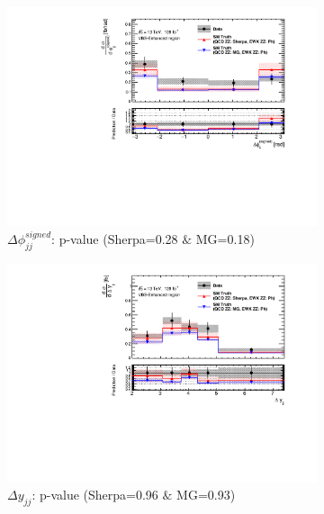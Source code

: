 \begin{figure}[!htb]
\begin{subfigure}{.49\textwidth}
        \centering
        \includegraphics[width=.98\linewidth]{figures/Results/CrossSection_VBSEnhanced/xs_dphi_SR.pdf}
        \caption{ \footnotesize{$\Delta \phi _{jj}^{signed}$: p-value (Sherpa=0.28 $\&$ MG=0.18)} }
    \end{subfigure}
    \begin{subfigure}{.49\textwidth}
        \centering
        \includegraphics[width=.98\linewidth]{figures/Results/CrossSection_VBSEnhanced/xs_dy_SR.pdf}
        \caption{ \footnotesize{$\Delta y_{jj}$: p-value (Sherpa=0.96 $\&$ MG=0.93)} }
    \end{subfigure}\\
    \begin{subfigure}{.49\textwidth}
        \centering

\end{subfigure}
\end{figure}
